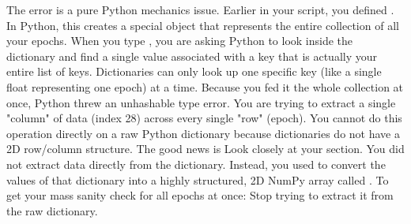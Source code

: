 {}
\markdownRendererSectionEnd \markdownRendererSectionBegin
{}\markdownRendererInterblockSeparator
{}\markdownRendererSectionBegin
{}\markdownRendererInterblockSeparator
{}The error  is a pure Python mechanics issue.\markdownRendererInterblockSeparator
{}Earlier in your script, you defined . In Python, this creates a special object that represents the entire collection of all your epochs.\markdownRendererInterblockSeparator
{}When you type , you are asking Python to look inside the dictionary and find a single value associated with a key that is actually your entire list of keys. Dictionaries can only look up one specific key (like a single float representing one epoch) at a time. Because you fed it the whole collection at once, Python threw an unhashable type error.\markdownRendererInterblockSeparator
{}
\markdownRendererSectionEnd \markdownRendererSectionBegin
{}\markdownRendererInterblockSeparator
{}You are trying to extract a single "column" of data (index 28) across every single "row" (epoch). You cannot do this operation directly on a raw Python dictionary because dictionaries do not have a 2D row/column structure.\markdownRendererInterblockSeparator
{}The good news is \markdownRendererInterblockSeparator
{}Look closely at your  section. You did not extract data directly from the  dictionary. Instead, you used  to convert the values of that dictionary into a highly structured, 2D NumPy array called .\markdownRendererInterblockSeparator
{}
\markdownRendererSectionEnd \markdownRendererSectionBegin
{}\markdownRendererInterblockSeparator
{}To get your mass sanity check for all epochs at once:\markdownRendererInterblockSeparator
{}\markdownRendererOlBegin
{}Stop trying to extract it from the raw  dictionary.\markdownRendererOlItemEnd 
